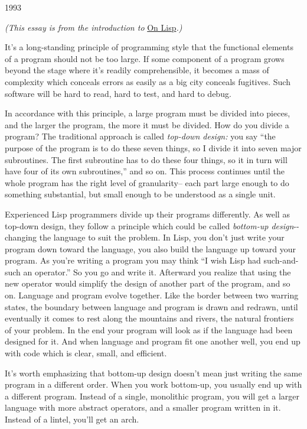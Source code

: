 1993

\emph{(This essay is from the introduction to} \href{onlisp.html}{On
Lisp}\emph{.)}

It's a long-standing principle of programming style that the functional
elements of a program should not be too large. If some component of a
program grows beyond the stage where it's readily comprehensible, it
becomes a mass of complexity which conceals errors as easily as a big
city conceals fugitives. Such software will be hard to read, hard to
test, and hard to debug.

In accordance with this principle, a large program must be divided into
pieces, and the larger the program, the more it must be divided. How do
you divide a program? The traditional approach is called \emph{top-down
design:} you say ``the purpose of the program is to do these seven
things, so I divide it into seven major subroutines. The first
subroutine has to do these four things, so it in turn will have four of
its own subroutines,'' and so on. This process continues until the whole
program has the right level of granularity-- each part large enough to
do something substantial, but small enough to be understood as a single
unit.

Experienced Lisp programmers divide up their programs differently. As
well as top-down design, they follow a principle which could be called
\emph{bottom-up design}-\/- changing the language to suit the problem.
In Lisp, you don't just write your program down toward the language, you
also build the language up toward your program. As you're writing a
program you may think ``I wish Lisp had such-and-such an operator.'' So
you go and write it. Afterward you realize that using the new operator
would simplify the design of another part of the program, and so on.
Language and program evolve together. Like the border between two
warring states, the boundary between language and program is drawn and
redrawn, until eventually it comes to rest along the mountains and
rivers, the natural frontiers of your problem. In the end your program
will look as if the language had been designed for it. And when language
and program fit one another well, you end up with code which is clear,
small, and efficient.

It's worth emphasizing that bottom-up design doesn't mean just writing
the same program in a different order. When you work bottom-up, you
usually end up with a different program. Instead of a single, monolithic
program, you will get a larger language with more abstract operators,
and a smaller program written in it. Instead of a lintel, you'll get an
arch.

